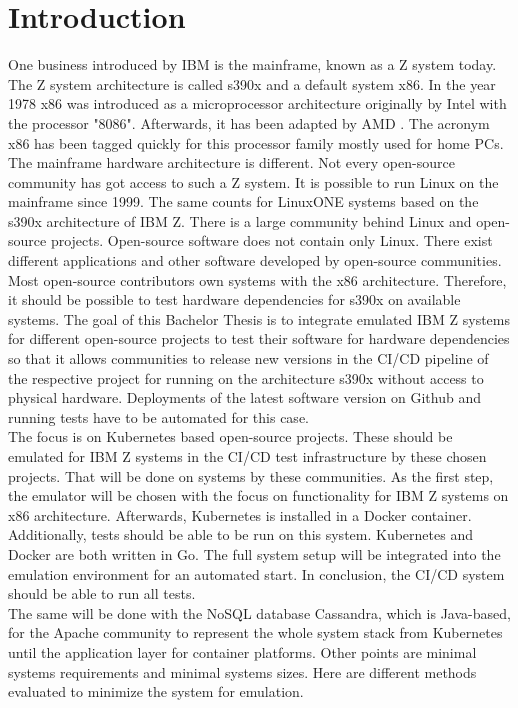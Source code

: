 \chapter{Introduction}\label{ch:intro}

One business introduced by IBM is the mainframe, known as a Z system today. The Z system architecture is called \gls{s390x} and a default system \gls{x86}. 
In the year 1978 x86 was introduced as a microprocessor architecture originally by Intel with the processor "8086". Afterwards, it has been adapted by AMD \cite{Ostler2020}. The acronym x86 has been tagged quickly for this processor family mostly used for home PCs. 
The mainframe hardware architecture is different. Not every open-source community has got access to such a Z system. It is possible to run Linux on the mainframe since 1999. The same counts for LinuxONE systems based on the s390x architecture of IBM Z. There is a large community behind Linux and open-source projects. Open-source software does not contain only \gls{Linux}. There exist different applications and other software developed by open-source communities. Most open-source contributors own systems with the x86 architecture. Therefore, it should be possible to test hardware dependencies for s390x on available systems. The goal of this Bachelor Thesis is to integrate emulated IBM Z systems for different open-source projects to test their software for hardware dependencies so that it allows communities to release new versions in the \gls{CI/CD} pipeline of the respective project for running on the architecture s390x without access to physical hardware. Deployments of the latest software version on Github and running tests have to be automated for this case.\\
The focus is on Kubernetes based open-source projects. These should be emulated for IBM Z systems in the \gls{CI/CD} test infrastructure by these chosen projects. That will be done on systems by these communities. As the first step, the emulator will be chosen with the focus on functionality for IBM Z systems on x86 architecture. Afterwards, Kubernetes is installed in a Docker container. Additionally, tests should be able to be run on this system. Kubernetes and Docker are both written in Go. The full system setup will be integrated into the emulation environment for an automated start. In conclusion, the \gls{CI/CD} system should be able to run all tests. \\
The same will be done with the NoSQL database Cassandra, which is Java-based, for the Apache community to represent the whole system stack from Kubernetes until the \gls{application layer} for container platforms. Other points are minimal systems requirements and minimal systems sizes. Here are different methods evaluated to minimize the system for emulation.


